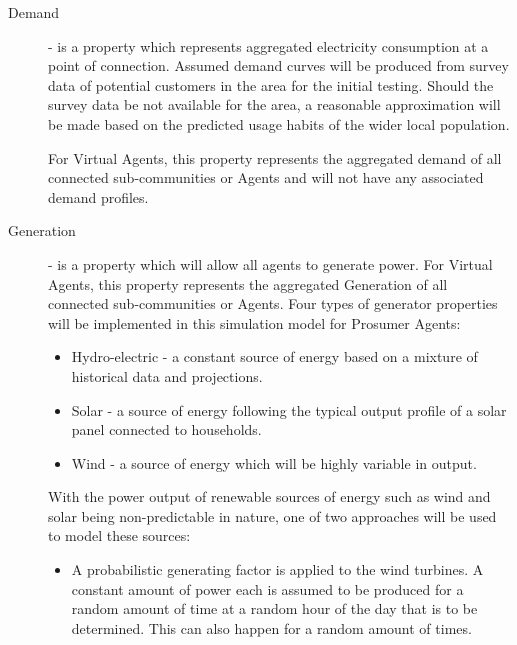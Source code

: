 \begin{description}
\item[Demand] - is a property which represents aggregated electricity consumption at a point of connection. Assumed demand curves will be produced from survey data of potential customers in the area for the initial testing. Should the survey data be not available for the area, a reasonable approximation will be made based on the predicted usage habits of the wider local population.

For Virtual Agents, this property represents the aggregated demand of all connected sub-communities or Agents and will not have any associated demand profiles.

\item[Generation] - is a property which will allow all agents to generate power. For Virtual Agents, this property represents the aggregated Generation of all connected sub-communities or Agents. Four types of generator properties will be implemented in this simulation model for Prosumer Agents: 

\begin{itemize}
  \item Hydro-electric - a constant source of energy based on a mixture of historical data and projections.
  \item Solar - a source of energy following the typical output profile of a solar panel connected to households.
  \item Wind - a source of energy which will be highly variable in output.
\end{itemize}

With the power output of renewable sources of energy such as wind and solar being non-predictable in nature, one of two approaches will be used to model these sources:
\begin{itemize}
  
  \item A probabilistic generating factor is applied to the wind turbines. A constant amount of power each is assumed to be produced for a random amount of time at a random hour of the day that is to be determined. This can also happen for a random amount of times.
  

\end{itemize}
\end{description}
